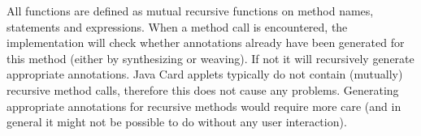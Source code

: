 All functions are defined as mutual recursive functions on method
names, statements and expressions. When a method call is encountered,
the implementation will check whether annotations already have been
generated for this method (either by synthesizing or weaving). If not
it will recursively generate appropriate annotations. Java Card
applets typically do not contain (mutually) recursive method calls,
therefore this does not cause any problems. Generating appropriate
annotations for recursive methods would require more care (and in
general it might not be possible to do without any user interaction).



